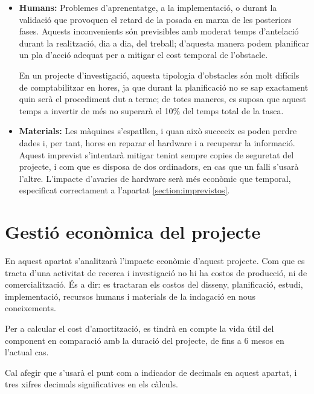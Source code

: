 \documentclass[a4paper]{article} %
\begin{document}
	\begin{itemize}
		\item \textbf{Humans:} Problemes d'aprenentatge, a la implementació, o durant la validació que provoquen el retard de la posada en marxa de les posteriors fases. Aquests inconvenients són previsibles amb moderat temps d'antelació durant la realització, dia a dia, del treball; d'aquesta manera podem planificar un pla d'acció adequat per a mitigar el cost temporal de l'obstacle.\par
		En un projecte d'investigació, aquesta tipologia d'obstacles són molt difícils de comptabilitzar en hores, ja que durant la planificació no se sap exactament quin serà el procediment dut a terme; de totes maneres, es suposa que aquest temps a invertir de més no superarà el 10\% del temps total de la tasca.
		\item \textbf{Materials:} Les màquines s'espatllen, i quan això succeeix es poden perdre dades i, per tant, hores en reparar el hardware i a recuperar la informació. Aquest imprevist s'intentarà mitigar tenint sempre copies de seguretat del projecte, i com que es disposa de dos ordinadors, en cas que un falli s'usarà l'altre. L'impacte d'avaries de hardware serà més econòmic que temporal, especificat correctament a l'apartat \ref{section:imprevistos}.
	\end{itemize}


	\section{Gestió econòmica del projecte}
	En aquest apartat s'analitzarà l'impacte econòmic d'aquest projecte. Com que es tracta d'una activitat de recerca i investigació no hi ha costos de producció, ni de comercialització. És a dir: es tractaran els costos del disseny, planificació, estudi, implementació, recursos humans i materials de la indagació en nous coneixements. \par 
	Per a calcular el cost d'amortització, es tindrà en compte la vida útil del component en comparació amb la duració del projecte, de fins a 6 mesos en l'actual cas. \par 
	Cal afegir que s'usarà el punt com a indicador de decimals en aquest apartat, i tres xifres decimals significatives en els càlculs.
	
\end{document}
